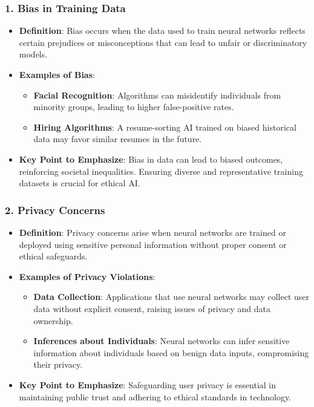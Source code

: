 \documentclass[aspectratio=169]{beamer}
\begin{document}
\begin{frame}[fragile]
    \frametitle{1. Bias in Training Data}
    \begin{itemize}
        \item \textbf{Definition}: Bias occurs when the data used to train neural networks reflects certain prejudices or misconceptions that can lead to unfair or discriminatory models.
        \item \textbf{Examples of Bias}:
        \begin{itemize}
            \item \textbf{Facial Recognition}: Algorithms can misidentify individuals from minority groups, leading to higher false-positive rates.
            \item \textbf{Hiring Algorithms}: A resume-sorting AI trained on biased historical data may favor similar resumes in the future.
        \end{itemize}
        \item \textbf{Key Point to Emphasize}: Bias in data can lead to biased outcomes, reinforcing societal inequalities. Ensuring diverse and representative training datasets is crucial for ethical AI.
    \end{itemize}
\end{frame}

\begin{frame}[fragile]
    \frametitle{2. Privacy Concerns}
    \begin{itemize}
        \item \textbf{Definition}: Privacy concerns arise when neural networks are trained or deployed using sensitive personal information without proper consent or ethical safeguards.
        \item \textbf{Examples of Privacy Violations}:
        \begin{itemize}
            \item \textbf{Data Collection}: Applications that use neural networks may collect user data without explicit consent, raising issues of privacy and data ownership.
            \item \textbf{Inferences about Individuals}: Neural networks can infer sensitive information about individuals based on benign data inputs, compromising their privacy.
        \end{itemize}
        \item \textbf{Key Point to Emphasize}: Safeguarding user privacy is essential in maintaining public trust and adhering to ethical standards in technology.
    \end{itemize}
\end{frame}
\end{document}
